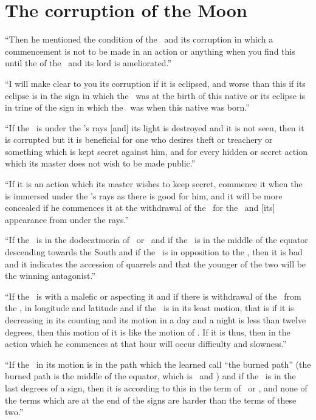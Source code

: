 \section{The corruption of the Moon}
``Then  he mentioned the condition of the \Moon\, and its corruption in which a commencement is not to be made in an action or anything when you find this until the of the \Moon\, and its lord is ameliorated.''

``I  will make clear to you its corruption if it is eclipsed, and worse than this if its eclipse is in the sign in which the \Moon\, was at the birth of this native or its eclipse is in trine of the sign in which the \Moon\, was when this native was born.''

``If  the \Moon\, is under the \Sun's rays [and] its light is destroyed and it is not seen, then it is corrupted but it is beneficial for one who desires theft or treachery or something which is kept secret against him, and for every hidden or secret action which its master does not wish to be made public.''

``If  it is an action which its master wishes to keep secret, commence it when the \Moon\, is immersed under the \Sun's rays as there is good for him, and it will be more concealed if he commences it at the withdrawal of the \Moon\, for the \Sun\, and [its] appearance from under the rays.''

``If  the \Moon\, is in the dodecatmoria of \Mars\, or \Saturn\, and if the \Moon\, is in the middle of the equator descending towards the South and if the \Moon\, is in opposition to the \Sun, then it is bad and it indicates the accession of quarrels and that the younger of the two will be the winning antagonist.''

``If  the \Moon\, is with a malefic or aspecting it and if there is withdrawal of the \Moon\, from the \Sun, in longitude and latitude and if the \Moon\, is in its least motion, that is if it is decreasing in its counting and its motion in a day and a night is less than twelve degrees, then this motion of it is like the motion of \Saturn. If it is thus, then in the action which he commences at that hour will occur difficulty and slowness.''

``If  the \Moon\, in its motion is in the path which the learned call ``the burned path'' (the burned path is the middle of the equator, which is \Libra\, and \Scorpio) and if the \Moon\, is in the last degrees of a sign, then it is according to this in the term of \Saturn\, or \Mars, and none of the terms which are at the end of the signs are harder than the terms of these two.''

